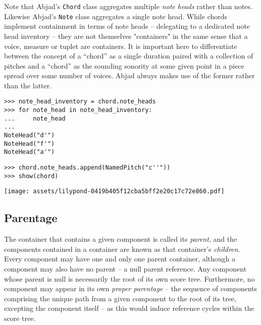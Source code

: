 \noindent Note that Abjad's \texttt{Chord} class aggregates multiple \emph{note
heads} rather than notes. Likewise Abjad's \texttt{Note} class aggregates a
single note head. While chords implement containment in terms of note heads --
delegating to a dedicated note head inventory -- they are not themselves
"containers" in the same sense that a voice, measure or tuplet are containers.
It is important here to differentiate between the concept of a \enquote{chord}
as a single duration paired with a collection of pitches and a \enquote{chord}
as the sounding sonority at some given point in a piece spread over some number
of voices. Abjad always makes use of the former rather than the latter.

\begin{comment}
<abjad>
note_head_inventory = chord.note_heads
for note_head in note_head_inventory:
    note_head

chord.note_heads.append(NamedPitch("c''"))
show(chord)
</abjad>
\end{comment}

\begin{abjadbookoutput}
\begin{singlespacing}
\vspace{-0.5\baselineskip}
\begin{verbatim}
>>> note_head_inventory = chord.note_heads
>>> for note_head in note_head_inventory:
...     note_head
...
NoteHead("d'")
NoteHead("f'")
NoteHead("a'")
\end{verbatim}
\begin{verbatim}
>>> chord.note_heads.append(NamedPitch("c''"))
>>> show(chord)
\end{verbatim}
\noindent\texttt{[image: assets/lilypond-0419b405f12cba5bff2e20c17c72e860.pdf]}
\end{singlespacing}
\end{abjadbookoutput}

\subsection{Parentage}
\label{ssec:parentage}

The container that contains a given component is called its \emph{parent}, and
the components contained in a container are known as that container's
\emph{children}. Every component may have one and only one parent container,
although a component may also have no parent -- a null parent reference. Any
component whose parent is null is necessarily the root of its own score tree.
Furthermore, no component may appear in its own \emph{proper parentage} -- the
sequence of components comprising the unique path from a given component to the
root of its tree, excepting the component itself -- as this would induce
reference cycles within the score tree.


